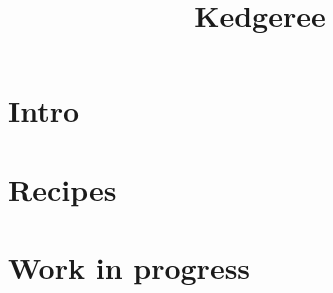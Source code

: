 \documentclass[11pt]{book}
\title{Kedgeree}
\author{}
\begin{document}
\maketitle
\def\title#1{\chapter{#1}}
\tableofcontents

\part{Intro}
        
        
\part{Recipes}
        
        
\part{Work in progress}
        
        


\printbibliography[title={Bibliography}]
\end{document}
